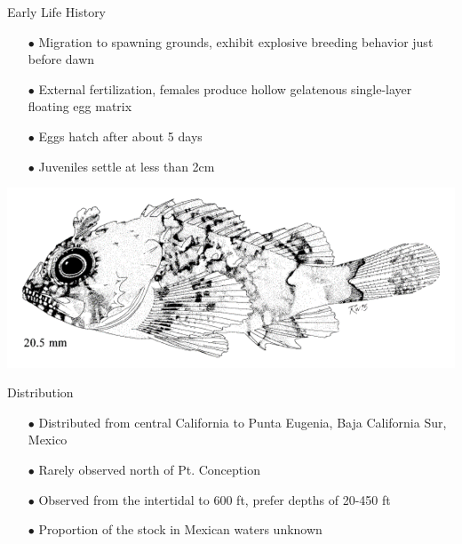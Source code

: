\documentclass[ignorenonframetext,]{beamer}
\begin{document}
\begin{frame}{Early Life History}

\begin{itemize} 
\item[$\bullet$] Migration to spawning grounds, exhibit explosive breeding behavior just before dawn
\item[$\bullet$] External fertilization, females produce hollow gelatenous single-layer floating egg matrix
\item[$\bullet$] Eggs hatch after about 5 days
\item[$\bullet$] Juveniles settle at less than 2cm 
\end{itemize}

\centering
\includegraphics[width=.5\textwidth]{Figures/baby_scorp}


\end{frame}

\begin{frame}{Distribution}

\begin{itemize} 
 \item[$\bullet$] Distributed from central California to Punta Eugenia, Baja California Sur, Mexico 
 \item[$\bullet$] Rarely observed north of Pt. Conception  
 \item[$\bullet$] Observed from the intertidal to 600 ft,  prefer depths of 20-450 ft  
 \item[$\bullet$] Proportion of the stock in Mexican waters unknown
\end{itemize}

\end{frame}
\end{document}
